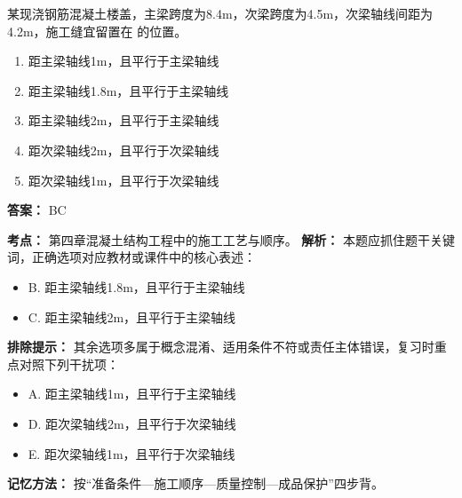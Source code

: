 \documentclass[UTF8,fontset=fandol,11pt]{ctexart}
\begin{document}
\begin{quizbox}[title={第 77 题}]
某现浇钢筋混凝土楼盖，主梁跨度为8.4m，次梁跨度为4.5m，次梁轴线间距为4.2m，施工缝宜留置在 的位置。\\
\begin{enumerate}[label=\Alph*.]
\item 距主梁轴线1m，且平行于主梁轴线
\item 距主梁轴线1.8m，且平行于主梁轴线
\item 距主梁轴线2m，且平行于主梁轴线
\item 距次梁轴线2m，且平行于次梁轴线
\item 距次梁轴线1m，且平行于次梁轴线
\end{enumerate}
\textbf{答案：} BC
\vspace{0.25em}
\begin{answerbox}[title={考点解析}]
\textbf{考点：} 第四章混凝土结构工程中的施工工艺与顺序。
\textbf{解析：} 本题应抓住题干关键词，正确选项对应教材或课件中的核心表述：
\begin{itemize}
\item B. 距主梁轴线1.8m，且平行于主梁轴线
\item C. 距主梁轴线2m，且平行于主梁轴线
\end{itemize}
\textbf{排除提示：} 其余选项多属于概念混淆、适用条件不符或责任主体错误，复习时重点对照下列干扰项：
\begin{itemize}
\item A. 距主梁轴线1m，且平行于主梁轴线
\item D. 距次梁轴线2m，且平行于次梁轴线
\item E. 距次梁轴线1m，且平行于次梁轴线
\end{itemize}
\textbf{记忆方法：} 按“准备条件—施工顺序—质量控制—成品保护”四步背。
\end{answerbox}
\end{quizbox}

\vspace{0.2em}
\end{document}
